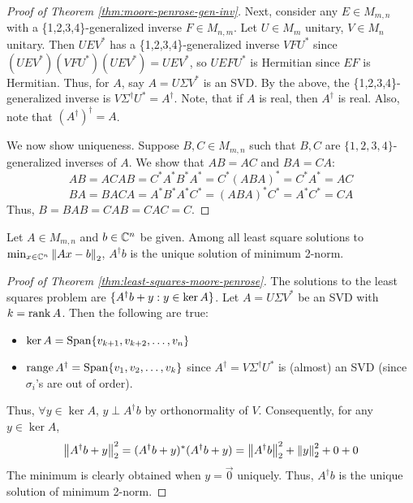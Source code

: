 \begin{proof}[Proof of Theorem \ref{thm:moore-penrose-gen-inv}]
Next, consider any $E \in M_{m,n}$ with a \{1,2,3,4\}-generalized inverse $F \in M_{n,m}$. Let $U \in M_m$ unitary, $V \in M_n$ unitary. Then $UEV^*$ has a \{1,2,3,4\}-generalized inverse $VFU^*$ since $(UEV^*)(VFU^*)(UEV^*)=UEV^*$, so $UEFU^*$ is Hermitian since $EF$ is Hermitian. Thus, for $A$, say $A = U\Sigma V^*$ is an SVD. By the above, the \{1,2,3,4\}-generalized inverse is $V\Sigma^\dag U^* = A^\dag$. Note, that if $A$ is real, then $A^\dag$ is real. Also, note that $\left(A^\dag\right)^\dag = A$.

We now show uniqueness. Suppose $B, C \in M_{m,n}$ such that $B,C$ are $\{1,2,3,4\}$-generalized inverses of $A$. We show that $AB = AC$ and $BA=CA$:
$$
AB = ACAB = C^*A^*B^*A^* = C^*(ABA)^* = C^*A^* = AC
$$
$$
BA = BACA = A^*B^*A^*C^* = (ABA)^*C^* = A^*C^* = CA
$$
Thus, $B = BAB = CAB = CAC = C$.
\end{proof}

\begin{theorem}
\label{thm:least-squares-moore-penrose}
Let $A \in M_{m,n}$ and $b \in \mathbb C^n$ be given. Among all least square solutions to $\min_{x \in \mathbb C^n} \left\lVert Ax-b\right\rVert_2$, $A^\dag b$ is the unique solution of minimum 2-norm.
\end{theorem}

\begin{proof}[Proof of Theorem \ref{thm:least-squares-moore-penrose}]
The solutions to the least squares problem are $\{A^\dag b + y : y \in \operatorname{ker} A\}$. Let $A=U\Sigma V^*$ be an SVD with $k = \operatorname{rank} A$. Then the following are true:
\begin{itemize}
    \item $\ker A = \operatorname{Span}\{v_{k+1}, v_{k+2}, \dots, v_n\}$
    \item $\operatorname{range} A^\dag = \operatorname{Span}\{v_1, v_2, \dots, v_k\}$ since $A^\dag = V\Sigma^\dag U^*$ is (almost) an SVD (since $\sigma_i$'s are out of order).
\end{itemize}

Thus, $\forall y \in \ker A$, $y \perp A^\dag b$ by orthonormality of $V$. Consequently, for any $y \in \ker A$,
$$
\left\lVert A^\dag b + y\right\rVert_2^2 = (A^\dag b + y)^*(A^\dag b + y) = \left\lVert A^\dag b\right\rVert_2^2 + \left\lVert y\right\rVert_2^2 + 0 + 0
$$
The minimum is clearly obtained when $y = \Vec{0}$ uniquely. Thus, $A^\dag b$ is the unique solution of minimum 2-norm.
\end{proof}

